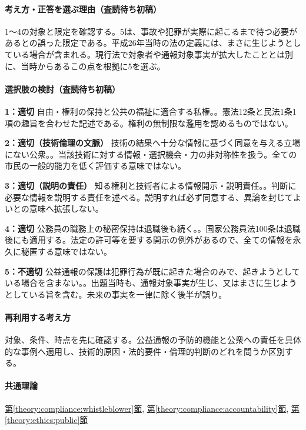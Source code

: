 \paragraph{考え方・正答を選ぶ理由（査読待ち初稿）} 1〜4の対象と限定を確認する。5は、事故や犯罪が実際に起こるまで待つ必要があるとの誤った限定である。平成26年当時の法の定義には、まさに生じようとしている場合が含まれる。現行法で対象者や通報対象事実が拡大したこととは別に、当時からあるこの点を根拠に5を選ぶ。

\paragraph{選択肢の検討（査読待ち初稿）}\mbox{}\par

\noindent\textbf{1：適切} 自由・権利の保持と公共の福祉に適合する私権。。憲法12条と民法1条1項の趣旨を合わせた記述である。権利の無制限な濫用を認めるものではない。\par

\noindent\textbf{2：適切（技術倫理の文脈）} 技術の結果へ十分な情報に基づく同意を与える立場にない公衆。。当該技術に対する情報・選択機会・力の非対称性を扱う。全ての市民の一般的能力を低く評価する意味ではない。\par

\noindent\textbf{3：適切（説明の責任）} 知る権利と技術者による情報開示・説明責任。。判断に必要な情報を説明する責任を述べる。説明すれば必ず同意する、異論を封じてよいとの意味へ拡張しない。\par

\noindent\textbf{4：適切} 公務員の職務上の秘密保持は退職後も続く。。国家公務員法100条は退職後にも適用する。法定の許可等を要する開示の例外があるので、全ての情報を永久に秘匿する意味ではない。\par

\noindent\textbf{5：不適切} 公益通報の保護は犯罪行為が既に起きた場合のみで、起きようとしている場合を含まない。。出題当時も、通報対象事実が生じ、又はまさに生じようとしている旨を含む。未来の事実を一律に除く後半が誤り。\par

\paragraph{再利用する考え方} 対象、条件、時点を先に確認する。公益通報の予防的機能と公衆への責任を具体的な事例へ適用し、技術的原因・法的要件・倫理的判断のどれを問うか区別する。

\paragraph{共通理論} \hyperref[theory:compliance:whistleblower]{第\ref*{theory:compliance:whistleblower}節}, \hyperref[theory:compliance:accountability]{第\ref*{theory:compliance:accountability}節}, \hyperref[theory:ethics:public]{第\ref*{theory:ethics:public}節}

